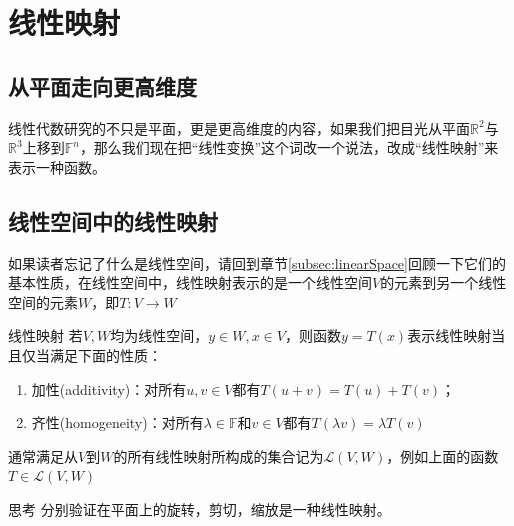 \section{线性映射}

\subsection{从平面走向更高维度}

线性代数研究的不只是平面，更是更高维度的内容，如果我们把目光从平面$\mathbb{R}^2$与$\mathbb{R}^3$上移到$\mathbb{F}^n$，那么我们现在把``线性变换''这个词改一个说法，改成``线性映射''来表示一种函数。

\subsection{线性空间中的线性映射}

如果读者忘记了什么是线性空间，请回到章节\ref{subsec:linearSpace}回顾一下它们的基本性质，在线性空间中，线性映射表示的是一个线性空间$V$的元素到另一个线性空间的元素$W$，即$T: V\rightarrow W$

\begin{definition}{线性映射}
	若$V,W$均为线性空间，$y\in W,x\in V$，则函数$y=T(x)$表示线性映射当且仅当满足下面的性质：
	\begin{enumerate}
		\item 加性(additivity)：对所有$u,v\in V$都有$T(u+v)=T(u)+T(v)$；
		\item 齐性(homogeneity)：对所有$\lambda \in \mathbb{F}$和$v\in V$都有$T(\lambda v)=\lambda T(v)$
	\end{enumerate}
	通常满足从$V$到$W$的所有线性映射所构成的集合记为$\mathcal{L}(V,W)$，例如上面的函数$T\in\mathcal{L}(V,W)$
\end{definition}

\begin{ascolorbox1}{思考}
	分别验证在平面上的旋转，剪切，缩放是一种线性映射。
\end{ascolorbox1}

